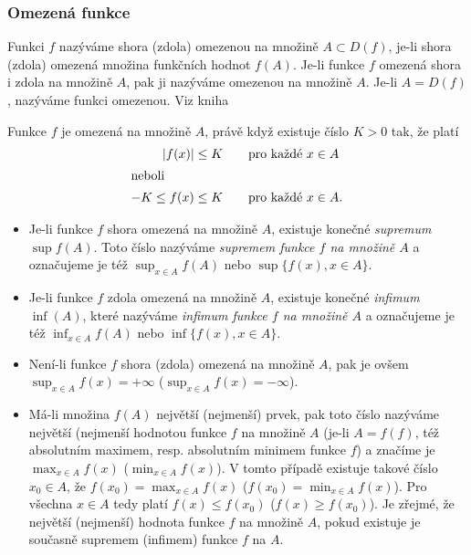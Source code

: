 {      \subsubsection{Omezená funkce}
        \begin{definition}\label{MA1:def_lim01}
          Funkci $f$ nazýváme shora (zdola) omezenou na množině $A\subset D(f)$, je-li shora 
          (zdola) omezená množina funkčních hodnot $f(A)$. Je-li funkce $f$ omezená shora i zdola 
          na množině $A$, pak ji nazýváme omezenou na množině $A$. Je-li $A=D(f)$, nazýváme funkci 
          omezenou. Viz kniha \cite[s.~87]{Brabec1989}       
        \end{definition}
        Funkce \(f\) je omezená na množině \(A\), právě když existuje číslo \(K>0\) tak, že platí
        \begin{align*}
         |f(x)|      &\leq K \qquad \text{pro každé } x\in A   \\ 
         \shortintertext{neboli}
         -K\leq f(x) &\leq K \qquad \text{pro každé } x\in A. 
        \end{align*}

          

        \begin{itemize}\addtolength{\itemsep}{-0.5\baselineskip}
          \item Je-li funkce $f$ shora omezená na množině $A$, existuje konečné \emph{supremum}     
                $\sup f(A)$. Toto číslo nazýváme \emph{supremem funkce $f$ na množině $A$} a 
                označujeme je též $\sup_{x\in A}f(A)$ nebo $\sup\{f(x), x\in A\}$.
          \item Je-li funkce $f$ zdola omezená na množině $A$, existuje konečné \emph{infimum} 
                $\inf(A)$, které nazýváme \emph{infimum funkce $f$ na množině $A$} a označujeme je 
                též $\inf_{x\in A}f(A)$ nebo $\inf\{f(x), x\in A\}$. 
          \item Není-li funkce $f$ shora (zdola) omezená na množině $A$, pak je ovšem $\sup_{x\in A}
                f(x)=+\infty$ ($\sup_{x\in A} f(x)=-\infty$).
          \item Má-li množina $f(A)$ největší (nejmenší) prvek, pak toto číslo nazýváme největší 
                (nejmenší hodnotou funkce $f$  na množině $A$ (je-li $A = f(f)$, též absolutním 
                maximem, resp. absolutním minimem funkce $f$) a značíme je $\max_{x\in A} f(x)$ 
                ($\min_{x\in A} f(x)$). V tomto případě existuje takové číslo $x_0\in A$, že 
                $f(x_0)=\max_{x\in A}f(x)$ ($f(x_0)=\min_{x\in A}f(x)$). Pro všechna $x\in A$ tedy 
                platí $f(x)\leq f(x_0)$ ($f(x)\geq f(x_0)$). Je zřejmé, že největší (nejmenší) 
                hodnota funkce $f$ na množině $A$, pokud existuje je současně supremem (infimem) 
                funkce $f$ na $A$.
        \end{itemize}

}
